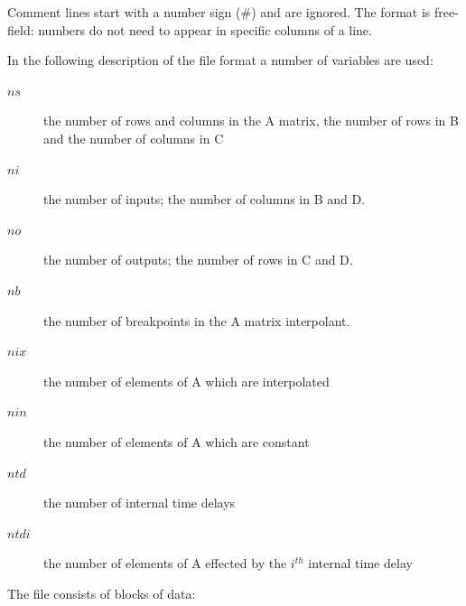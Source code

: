 \documentclass[11pt,openany,twoside]{book}
\numberwithin{equation}{section}		%
\begin{document}
Comment lines start with a number sign (\#) and
are ignored.
The format is free-field: numbers do not need to
appear in specific columns of a line.
\par
In the following description of the file format a
number of variables are used:
\begin{description}
	\item[$ns$] the number of rows and columns in the A matrix,
                the number of rows in B and the number of columns in C
	\item[$ni$] the number of inputs; the number of columns in B and D.
	\item[$no$] the number of outputs; the number of rows in C and D.
	\item[$nb$] the number of breakpoints in the A matrix interpolant.
	\item[$nix$] the number of elements of A which are interpolated
	\item[$nin$] the number of elements of A which are constant
	\item[$ntd$] the number of internal time delays
	\item[$ntdi$] the number of elements of A effected by the
						$i^{th}$ internal time delay
\end{description}
\par
The file consists of blocks of data:
\end{document}

